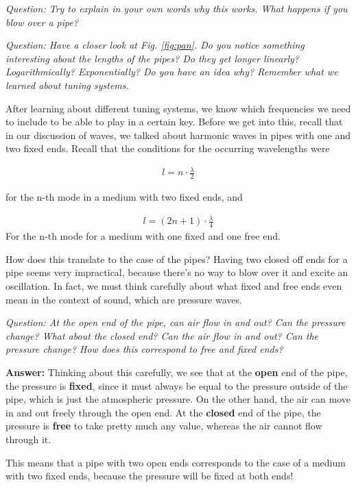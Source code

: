 \textit{Question: Try to explain in your own words why this works. What happens if you blow over a pipe?}

\textit{Question: Have a closer look at Fig. \ref{fig:pan}. Do you notice something interesting about the lengths of the pipes? Do they get longer linearly? Logarithmically? Exponentially? Do you have an idea why? Remember what we learned about tuning systems.}

After learning about different tuning systems, we know which frequencies we need to include to be able to play in a certain key. 
Before we get into this, recall that in our discussion of waves, we talked about harmonic waves in pipes with one and two fixed ends. Recall that the conditions for the occurring wavelengths were 

\begin{align}
    l = n \cdot \frac{\lambda}{2}
\end{align}

for the n-th mode in a medium with two fixed ends, and 

\begin{align}
    l = (2n+1) \cdot \frac{\lambda}{4}
\end{align}
For the n-th mode for a medium with one fixed and one free end.

How does this translate to the case of the pipes? Having two closed off ends for a pipe seems very impractical, because there's no way to blow over it and excite an oscillation. In fact, we must think carefully about what fixed and free ends even mean in the context of sound, which are pressure waves.

\textit{Question: At the open end of the pipe, can air flow in and out? Can the pressure change? What about the closed end? Can the air flow in and out? Can the pressure change? How does this correspond to free and fixed ends?}

\textbf{Answer:} Thinking about this carefully, we see that at the \textbf{open} end of the pipe, the pressure is \textbf{fixed}, since it must always be equal to the pressure outside of the pipe, which is just the atmospheric pressure. On the other hand, the air can move in and out freely through the open end. 
At the \textbf{closed} end of the pipe, the pressure is \textbf{free} to take pretty much any value, whereas the air cannot flow through it.

This means that a pipe with two open ends corresponds to the case of a medium with two fixed ends, because the pressure will be fixed at both ends!

